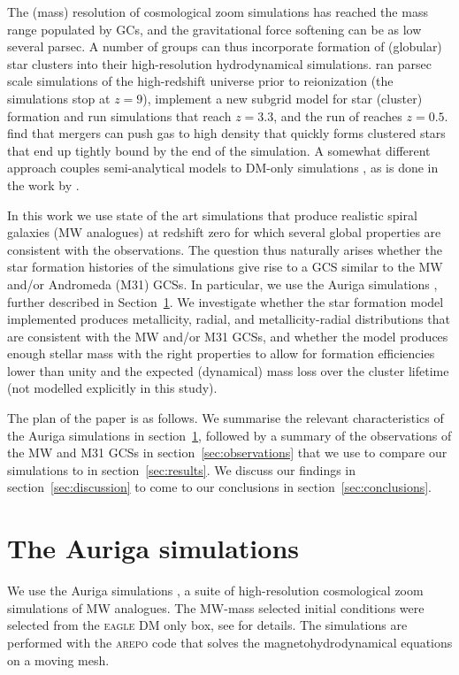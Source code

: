 \documentclass[a4paper,fleqn,usenatbib]{mnras}
\begin{document}
The (mass) resolution of cosmological zoom simulations has reached the mass range 
populated by GCs, and the gravitational force softening can be as low several 
parsec. A number of groups can thus incorporate formation of (globular) star 
clusters into their high-resolution hydrodynamical simulations. \citet{2016ApJ...831..204R} 
ran parsec scale simulations of the high-redshift universe 
prior to reionization (the simulations stop at $z=9$), \citet{2017ApJ...834...69L} 
implement a new subgrid model for star (cluster) formation and run simulations 
that reach $z=3.3$, and the run of \citet{2017MNRAS.465.3622R} reaches $z=0.5$. 
\citet{2018MNRAS.474.4232K} find that mergers can push gas to high density that
quickly forms clustered stars that end up tightly bound by the end of the 
simulation. A somewhat different approach couples semi-analytical models to DM-only
simulations \citep{2010ApJ...718.1266M,2014ApJ...796...10L,2018MNRAS.480.2343C,
2019MNRAS.486..331C,2019arXiv190505199C}, as is done in the work by 
\citet{2019MNRAS.482.4528E}.

In this work we use state of the art simulations that produce realistic spiral 
galaxies (MW analogues) at redshift zero for which several global properties 
are consistent with the observations. The question thus naturally arises whether 
the star formation histories of the simulations give rise to a GCS similar to 
the MW and/or Andromeda (M31) GCSs. In particular, 
we use the Auriga simulations \citep[][hereafter G17]{2017MNRAS.467..179G}, 
further described in Section~\ref{sec:auriga}. We investigate whether the star 
formation model implemented produces metallicity, 
radial, and metallicity-radial distributions that are consistent with the MW 
and/or M31 GCSs, and whether the model produces enough stellar mass with
the right properties to allow for formation efficiencies lower than unity and
the expected (dynamical) mass loss over the cluster lifetime (not modelled 
explicitly in this study). 

The plan of the paper is as follows. We summarise the relevant characteristics 
of the Auriga simulations in section~\ref{sec:auriga}, followed by a summary of 
the observations of the MW and M31 GCSs
in section~\ref{sec:observations} that we use to compare our simulations to in
section~\ref{sec:results}. We discuss our findings in section~\ref{sec:discussion}
to come to our conclusions in section~\ref{sec:conclusions}.


\section{The Auriga simulations}
\label{sec:auriga}
We use the Auriga simulations , a suite of 
high-resolution cosmological zoom simulations of MW analogues. The MW-mass
selected initial conditions were selected from the \mbox{\textsc{eagle}} DM only 
box, see  for details. The simulations are 
performed with the \textsc{arepo} code \citep{2010MNRAS.401..791S, 2016MNRAS.455.1134P} 
that solves the magnetohydrodynamical equations on a moving mesh. 
\end{document}
